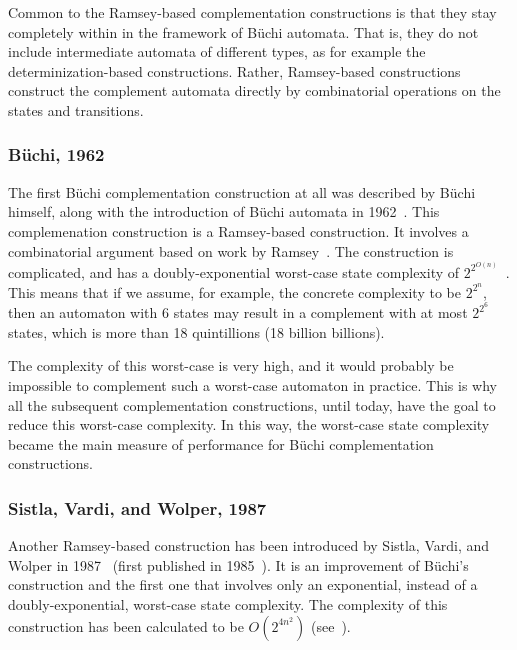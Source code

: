Common to the  Ramsey-based complementation constructions is that they stay completely within in the framework of Büchi automata. That is, they do not include intermediate automata of different types, as for example the determinization-based constructions. Rather, Ramsey-based constructions construct the complement automata directly by combinatorial operations on the states and transitions.

\subsubsection{Büchi, 1962}
\label{2_buchi62}

The first Büchi complementation construction at all was described by Büchi himself, along with the introduction of Büchi automata in 1962~\cite{buchi1960decision}. This complemenation construction is a Ramsey-based construction. It involves a combinatorial argument based on work by Ramsey~\cite{1930ramsey}. The construction is complicated, and has a doubly-exponential worst-case state complexity of $2^{2^{O\left(n\right)}}$~\cite{vardi2005buchi}. This means that if we assume, for example, the concrete complexity to be $2^{2^n}$, then an automaton with 6 states may result in a complement with at most $2^{2^6}$ states, which is more than 18 quintillions (18 billion billions).

The complexity of this worst-case is very high, and it would probably be impossible to complement such a worst-case automaton in practice. This is why all the subsequent complementation constructions, until today, have the goal to reduce this worst-case complexity. In this way, the worst-case state complexity became the main measure of performance for Büchi complementation constructions.

\subsubsection{Sistla, Vardi, and Wolper, 1987}
\label{2_svw87}

Another Ramsey-based construction has been introduced by Sistla, Vardi, and Wolper in 1987~\cite{PrasadSistla1987217} (first published in 1985~\cite{1985_sistla}). It is an improvement of Büchi's construction and the first one that involves only an exponential, instead of a doubly-exponential, worst-case state complexity. The complexity of this construction has been calculated to be $O\left(2^{4n^2}\right)$ (see~\cite{1988_safra_2}\cite{Pecuchet198695}).

